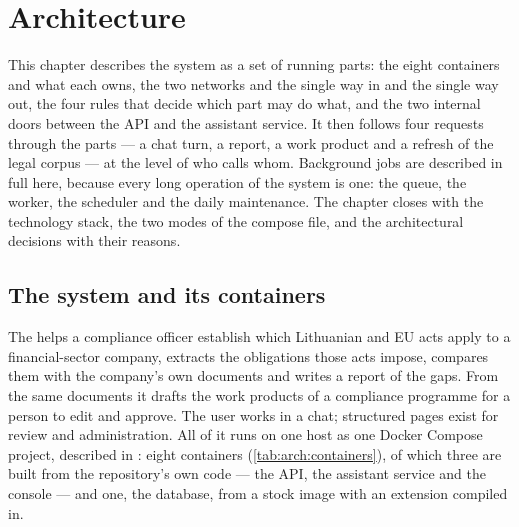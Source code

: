 \chapter{Architecture}\label{ch:arch}

This chapter describes the system as a set of running parts: the eight containers and what each
owns, the two networks and the single way in and the single way out, the four rules that decide
which part may do what, and the two internal doors between the API and the assistant service.
It then follows four requests through the parts --- a chat turn, a report, a work product and a
refresh of the legal corpus --- at the level of who calls whom. Background jobs are described
in full here, because every long operation of the system is one: the queue, the worker, the
scheduler and the daily maintenance. The chapter closes with the technology stack, the two
modes of the compose file, and the architectural decisions with their reasons.

\section{The system and its containers}\label{sec:arch:containers}

The \product{} helps a compliance officer establish which Lithuanian and EU acts apply to a
financial-sector company, extracts the obligations those acts impose, compares them with the
company's own documents and writes a report of the gaps. From the same documents it drafts the
work products of a compliance programme for a person to edit and approve. The user works in a
chat; structured pages exist for review and administration. All of it runs on one host as one
Docker Compose project, described in : eight containers
(\cref{tab:arch:containers}), of which three are built from the repository's own code --- the
API, the assistant service and the console --- and one, the database, from a stock image with
an extension compiled in.

